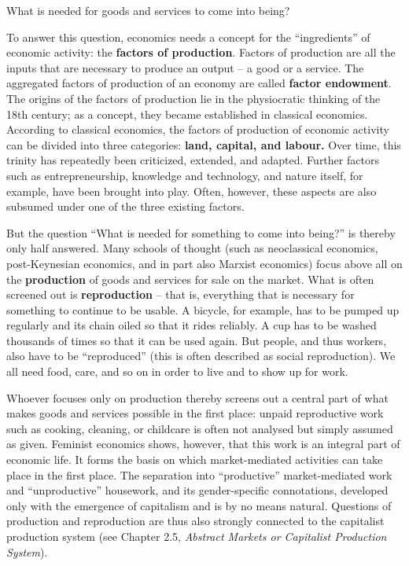 \documentclass[
  british,
  a4paper,
  DIV=11,
  numbers=noendperiod,
  oneside,
  openany]{scrreprt}
\begin{document}
\begin{tcolorbox}[enhanced jigsaw, arc=.35mm, bottomrule=.15mm, bottomtitle=1mm, breakable, colback=white, colbacktitle=quarto-callout-note-color!10!white, colframe=quarto-callout-note-color-frame, coltitle=black, left=2mm, leftrule=.75mm, opacityback=0, opacitybacktitle=0.6, rightrule=.15mm, title={Guiding question}, titlerule=0mm, toprule=.15mm, toptitle=1mm]

What is needed for goods and services to come into being?

\end{tcolorbox}

To answer this question, economics needs a concept for the
``ingredients'' of economic activity: the \textbf{factors of
production}. Factors of production are all the inputs that are necessary
to produce an output -- a good or a service. The aggregated factors of
production of an economy are called \textbf{factor endowment}. The
origins of the factors of production lie in the physiocratic thinking of
the 18th century; as a concept, they became established in classical
economics. According to classical economics, the factors of production
of economic activity can be divided into three categories: \textbf{land,
capital, and labour.} Over time, this trinity has repeatedly been
criticized, extended, and adapted. Further factors such as
entrepreneurship, knowledge and technology, and nature itself, for
example, have been brought into play. Often, however, these aspects are
also subsumed under one of the three existing factors.

But the question ``What is needed for something to come into being?'' is
thereby only half answered. Many schools of thought (such as
neoclassical economics, post-Keynesian economics, and in part also
Marxist economics) focus above all on the \textbf{production} of goods
and services for sale on the market. What is often screened out is
\textbf{reproduction} -- that is, everything that is necessary for
something to continue to be usable. A bicycle, for example, has to be
pumped up regularly and its chain oiled so that it rides reliably. A cup
has to be washed thousands of times so that it can be used again. But
people, and thus workers, also have to be ``reproduced'' (this is often
described as social reproduction). We all need food, care, and so on in
order to live and to show up for work.

Whoever focuses only on production thereby screens out a central part of
what makes goods and services possible in the first place: unpaid
reproductive work such as cooking, cleaning, or childcare is often not
analysed but simply assumed as given. Feminist economics shows, however,
that this work is an integral part of economic life. It forms the basis
on which market-mediated activities can take place in the first place.
The separation into ``productive'' market-mediated work and
``unproductive'' housework, and its gender-specific connotations,
developed only with the emergence of capitalism and is by no means
natural. Questions of production and reproduction are thus also strongly
connected to the capitalist production system (see Chapter 2.5,
\emph{Abstract Markets or Capitalist Production System}).
\end{document}
